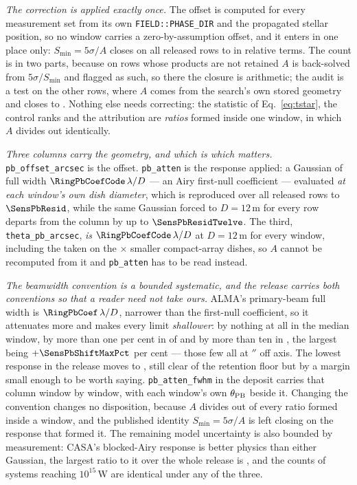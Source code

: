 \emph{The correction is applied exactly once.} The offset is computed for
every measurement set from its own \texttt{FIELD::PHASE\_DIR} and the
propagated stellar position, so no window carries a zero-by-assumption
offset, and it enters in one place only: $S_{\min}=5\sigma/A$ closes on all
\PbSminClosed{} released rows to \PbSminWorstRes{} in relative terms. The
count is in two parts, because on \PbSminTaut{} rows whose products are not
retained $A$ is back-solved from $5\sigma/S_{\min}$ and flagged as such, so
there the closure is arithmetic; the audit is a test on the other
\PbSminIndep{} rows, where $A$ comes from the search's own stored geometry and
closes to \PbSminIndepRes. Nothing else needs correcting: the statistic of
Eq.~\ref{eq:tstar}, the control ranks and the attribution are \emph{ratios}
formed inside one window, in which $A$ divides out identically.

\emph{Three columns carry the geometry, and which is which matters.}
\texttt{pb\_offset\_arcsec} is the offset. \texttt{pb\_atten} is the response
applied: a Gaussian of full width $\RingPbCoefCode\,\lambda/D$ --- an Airy
first-null coefficient --- evaluated \emph{at each window's own dish
diameter}, which is reproduced over all \NWindows{} released rows to
$\SensPbResid$, while the same Gaussian forced to $D=12$\,m for every row
departs from the column by up to $\SensPbResidTwelve$. The third,
\texttt{theta\_pb\_arcsec}, \emph{is} $\RingPbCoefCode\,\lambda/D$ at
$D=12$\,m for every window, including the \PbNAcaRow{} taken on the
\PbAcaRatio$\times$ smaller compact-array dishes, so $A$ cannot be recomputed
from it and \texttt{pb\_atten} has to be read instead.

\emph{The beamwidth convention is a bounded systematic, and the release
carries both conventions so that a reader need not take ours.} ALMA's
primary-beam full width is $\RingPbCoef\,\lambda/D$, narrower than the
first-null coefficient, so it attenuates more and makes every limit
\emph{shallower}: by nothing at all in the median window, by more than one
per cent in \SensPbNOnePct{} of \NWindows{} and by more than ten in
\SensPbNTenPct, the largest being $+\SensPbShiftMaxPct$ per cent --- those
few all \SensPbWorstStar{} at \SensPbWorstOff$''$ off axis. The lowest
response in the release moves \SensPbAMin{} to \SensPbAMinAlma, still clear
of the \SensPbFloor{} retention floor but by a margin small enough to be
worth saying. \texttt{pb\_atten\_fwhm} in the deposit carries that column
window by window, with each window's own $\theta_{\rm PB}$ beside it.
Changing the convention changes no disposition, because $A$ divides out of
every ratio formed inside a window, and the published identity
$S_{\min}=5\sigma/A$ is left closing on the response that formed it. The
remaining model uncertainty is also bounded by measurement: CASA's
blocked-Airy response is better physics than either Gaussian, the largest
ratio to it over the whole release is \PbModelMax, and the counts of systems
reaching $10^{15}$\,W are identical under any of the three.

